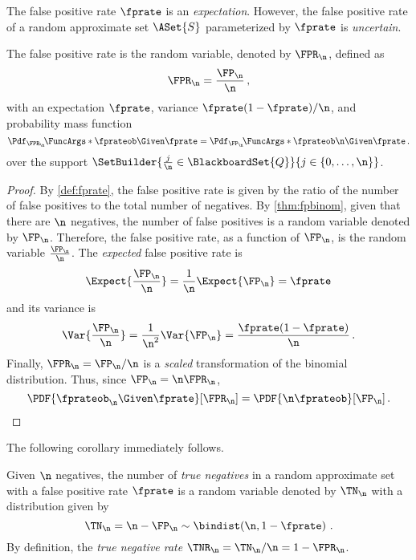 \documentclass[ ../main.tex]{subfiles}
\begin{document}
The false positive rate $\fprate$ is an \emph{expectation}.
However, the false positive rate of a random approximate set $\ASet{S}$ parameterized by $\fprate$ is \emph{uncertain}.
\begin{theorem}
\label{thm:fpr}
The false positive rate is the random variable, denoted by $\FPR_\n$, defined as
\begin{equation}
    \FPR_\n = \frac{\FP_\n}{\n}\,,
\end{equation}
with an expectation $\fprate$, variance $\fprate(1-\fprate) / \n$, and probability mass function
\begin{equation}
	\Pdf_{\FPR_\n}\!\FuncArgs*{\fprateob \Given \fprate} = \Pdf_{\FP_\n}\!\FuncArgs*{\fprateob \n \Given \fprate}\,.
\end{equation}
over the support $\SetBuilder{ \frac{j}{\n} \in \BlackboardSet{Q}}{j \in \{0,\ldots,\n\}}$.
\end{theorem}
\begin{proof}
By \cref{def:fprate}, the false positive rate is given by the ratio of the number of false positives to the total number of negatives.
By \cref{thm:fpbinom}, given that there are $\n$ negatives, the number of false positives is a random variable denoted by $\FP_\n$.
Therefore, the false positive rate, as a function of $\FP_\n$, is the random variable $\frac{\FP_\n}{\n}$.
The \emph{expected} false positive rate is
\begin{equation}
    \Expect{\frac{\FP_\n}{\n}} = \frac{1}{\n}\Expect{\FP_\n} = \fprate
\end{equation}
and its variance is
\begin{equation}
    \Var{\frac{\FP_\n}{\n}} = \frac{1}{\n^2}\Var{\FP_\n} = \frac{\fprate(1-\fprate)}{\n}\,.
\end{equation}
Finally, $\FPR_\n = \FP_\n / \n$ is a \emph{scaled} transformation of the binomial distribution.
Thus, since $\FP_\n = \n \FPR_\n$,
\begin{equation}
	\PDF{\fprateob_\n \Given \fprate}[\FPR_\n] = \PDF{\n \fprateob}[\FP_\n]\,.
\end{equation}
\end{proof}
The following corollary immediately follows.
\begin{corollary}
	\label{cor:tnbinom}
	Given $\n$ negatives, the number of \emph{true negatives} in a random approximate set with a false positive rate $\fprate$ is a random variable denoted by $\TN_\n$ with a distribution given by
	\begin{equation}
	\TN_\n = \n - \FP_\n \sim \bindist\!\left(\n, 1-\fprate\right)\,.
	\end{equation}
	By definition, the \emph{true negative rate} $\TNR_\n = \TN_\n / \n = 1 - \FPR_\n$.
\end{corollary}
\end{document}

